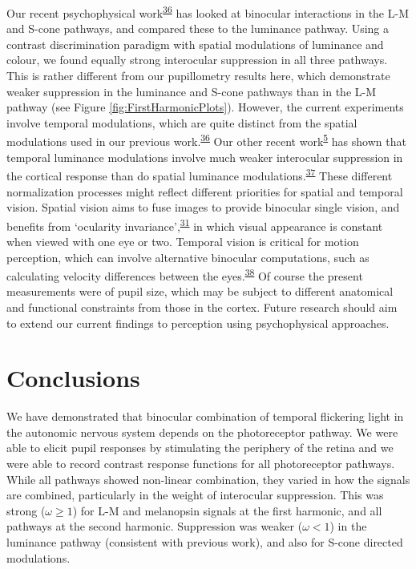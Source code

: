 \documentclass[
]{article}
\begin{document}
Our recent psychophysical work\textsuperscript{\protect\hyperlink{ref-Baker2024}{36}} has looked at binocular interactions in the L-M and S-cone pathways, and compared these to the luminance pathway. Using a contrast discrimination paradigm with spatial modulations of luminance and colour, we found equally strong interocular suppression in all three pathways. This is rather different from our pupillometry results here, which demonstrate weaker suppression in the luminance and S-cone pathways than in the L-M pathway (see Figure \ref{fig:FirstHarmonicPlots}). However, the current experiments involve temporal modulations, which are quite distinct from the spatial modulations used in our previous work.\textsuperscript{\protect\hyperlink{ref-Baker2024}{36}} Our other recent work\textsuperscript{\protect\hyperlink{ref-Segala2023}{5}} has shown that temporal luminance modulations involve much weaker interocular suppression in the cortical response than do spatial luminance modulations.\textsuperscript{\protect\hyperlink{ref-Baker2017}{37}} These different normalization processes might reflect different priorities for spatial and temporal vision. Spatial vision aims to fuse images to provide binocular single vision, and benefits from `ocularity invariance',\textsuperscript{\protect\hyperlink{ref-Baker2007}{31}} in which visual appearance is constant when viewed with one eye or two. Temporal vision is critical for motion perception, which can involve alternative binocular computations, such as calculating velocity differences between the eyes.\textsuperscript{\protect\hyperlink{ref-Kaestner2019}{38}} Of course the present measurements were of pupil size, which may be subject to different anatomical and functional constraints from those in the cortex. Future research should aim to extend our current findings to perception using psychophysical approaches.

\hypertarget{conclusions}{%
\section{Conclusions}\label{conclusions}}

We have demonstrated that binocular combination of temporal flickering light in the autonomic nervous system depends on the photoreceptor pathway. We were able to elicit pupil responses by stimulating the periphery of the retina and we were able to record contrast response functions for all photoreceptor pathways. While all pathways showed non-linear combination, they varied in how the signals are combined, particularly in the weight of interocular suppression. This was strong (\(\omega \ge 1\)) for L-M and melanopsin signals at the first harmonic, and all pathways at the second harmonic. Suppression was weaker (\(\omega < 1\)) in the luminance pathway (consistent with previous work), and also for S-cone directed modulations.
\end{document}
